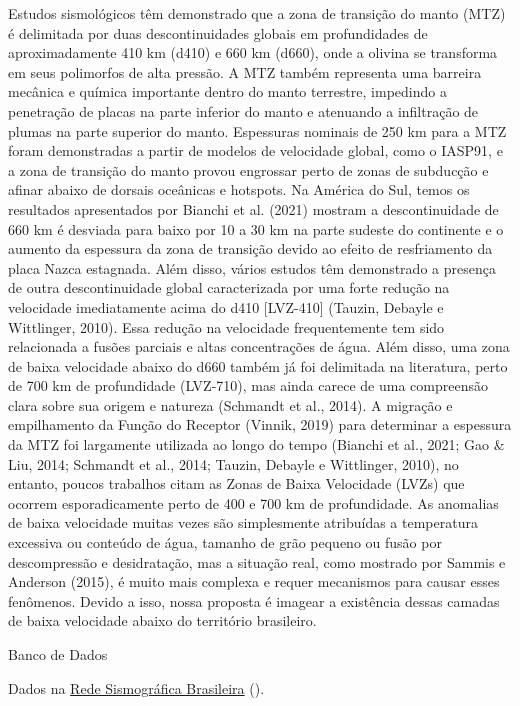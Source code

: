 \documentclass[10pt,a4paper,oneside]{book}
\begin{document}
Estudos sismológicos têm demonstrado que a zona de transição do manto (MTZ) é delimitada por duas descontinuidades globais em profundidades de aproximadamente 410 km (d410) e 660 km (d660), onde a olivina se transforma em seus polimorfos de alta pressão. A MTZ também representa uma barreira mecânica e química importante dentro do manto terrestre, impedindo a penetração de placas na parte inferior do manto e atenuando a infiltração de plumas na parte superior do manto. Espessuras nominais de 250 km para a MTZ foram demonstradas a partir de modelos de velocidade global, como o IASP91, e a zona de transição do manto provou engrossar perto de zonas de subducção e afinar abaixo de dorsais oceânicas e hotspots. Na América do Sul, temos os resultados apresentados por Bianchi et al. (2021) mostram a descontinuidade de 660 km é desviada para baixo por 10 a 30 km na parte sudeste do continente e o aumento da espessura da zona de transição devido ao efeito de resfriamento da placa Nazca estagnada. Além disso, vários estudos têm demonstrado a presença de outra descontinuidade global caracterizada por uma forte redução na velocidade imediatamente acima do d410 [LVZ-410] (Tauzin, Debayle e Wittlinger, 2010). Essa redução na velocidade frequentemente tem sido relacionada a fusões parciais e altas concentrações de água. Além disso, uma zona de baixa velocidade abaixo do d660 também já foi delimitada na literatura, perto de 700 km de profundidade (LVZ-710), mas ainda carece de uma compreensão clara sobre sua origem e natureza (Schmandt et al., 2014). A migração e empilhamento da Função do Receptor (Vinnik, 2019) para determinar a espessura da MTZ foi largamente utilizada ao longo do tempo (Bianchi et al., 2021; Gao \& Liu, 2014; Schmandt et al., 2014; Tauzin, Debayle e Wittlinger, 2010), no entanto, poucos trabalhos citam as Zonas de Baixa Velocidade (LVZs) que ocorrem esporadicamente perto de 400 e 700 km de profundidade. As anomalias de baixa velocidade muitas vezes são simplesmente atribuídas a temperatura excessiva ou conteúdo de água, tamanho de grão pequeno ou fusão por descompressão e desidratação, mas a situação real, como mostrado por Sammis e Anderson (2015), é muito mais complexa e requer mecanismos para causar esses fenômenos. Devido a isso, nossa proposta é imagear a existência dessas camadas de baixa velocidade abaixo do território brasileiro.

\begin{fancyenum}{\faDatabase}{Banco de Dados}
	\item Dados na \href{http://rsbr.on.br/}{Rede Sismográfica Brasileira} (\faUnlock).
\end{fancyenum}
\end{document}
